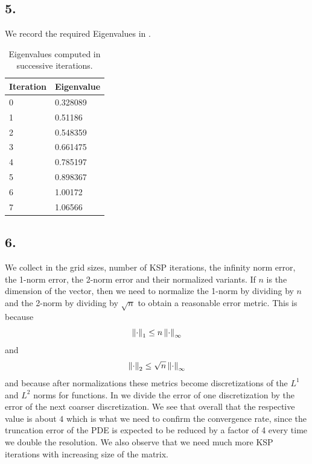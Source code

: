 \subsection*{5.}
\FloatBarrier
We record the required Eigenvalues in .
\begin{table}[h!]
\centering
\begin{tabular}{|l|l|}
\hline
\textbf{Iteration} & \textbf{Eigenvalue} \\ \hline
0 & 0.328089 \\ \hline
1 & 0.51186 \\ \hline
2 & 0.548359 \\ \hline
3 & 0.661475 \\ \hline
4 & 0.785197 \\ \hline
5 & 0.898367 \\ \hline
6 & 1.00172 \\ \hline
7 & 1.06566 \\ \hline
\end{tabular}
\caption{Eigenvalues computed in successive iterations.}
\label{evals}
\end{table}




\FloatBarrier


\subsection*{6.}
\FloatBarrier
We collect in  the grid sizes, number of KSP iterations, the infinity norm error, the 1-norm error, the 2-norm error and their normalized variants. If $n$ is the dimension of the vector, then we need to normalize the 1-norm by dividing by $n$ and the 2-norm by dividing by $\sqrt{n}$ to obtain a reasonable error metric. This is because
\[
\left\lVert\cdot\right\rVert_{1} \leq n \left\lVert\cdot\right\rVert_{\infty}
\]
and
\[
\left\lVert\cdot\right\rVert_2 \leq \sqrt{n} \left\lVert\cdot\right\rVert_{\infty}
\]
and because after normalizations these metrics become discretizations of the $L^1$ and $L^2$ norms for functions. In  we divide the error of one discretization by the error of the next coarser discretization. We see that overall that the respective value is about $4$ which is what we need to confirm the convergence rate, since the truncation error of the PDE is expected to be reduced by a factor of 4 every time we double the resolution. We also observe that we need much more KSP iterations with increasing size of the matrix.

